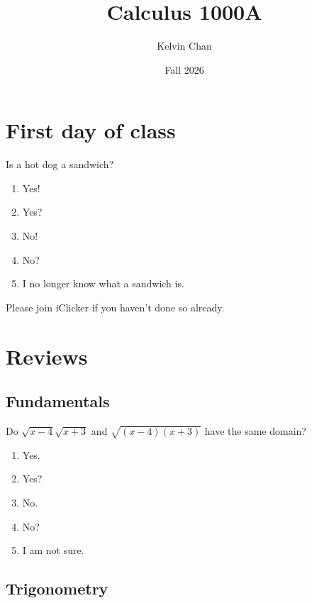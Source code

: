 \documentclass[aspectratio=169, 14pt, t]{beamer}  %
\title{Calculus 1000A}
\date{Fall 2026}
\author{Kelvin Chan}
\institute{Department of Mathematics\\University of Western Ontario}
\begin{document}
\section{First day of class}

\begin{poll}
  Is a hot dog a sandwich?

  \begin{minipage}{0.5\textwidth}
    \begin{enumerate}
      \item Yes!
      \item Yes?
      \item No!
      \item No?
      \item I no longer know what a sandwich is.
    \end{enumerate}
  \end{minipage}
  \hfill{}
  \begin{minipage}{0.45\textwidth}
    \centering


    \bigskip

    Please join iClicker  if you haven't done so already.
  \end{minipage}
\end{poll}

\section{Reviews}

\subsection{Fundamentals}

\begin{poll}
  Do \(\sqrt{x-4}\sqrt{x+3}\) and \(\sqrt{(x-4)(x+3)}\) have the same domain?

  \begin{enumerate}
    \item Yes.
    \item Yes?
    \item No.
    \item No?
    \item I am not sure.
  \end{enumerate}
\end{poll}

\subsection{Trigonometry}
\end{document}
